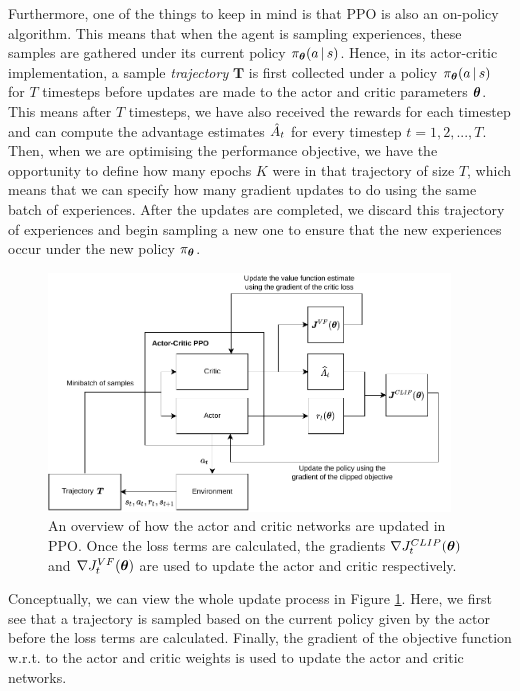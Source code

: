 Furthermore, one of the things to keep in mind is that PPO is also an on-policy algorithm. This means that when the agent is sampling experiences, these samples are gathered under its current policy $\pi_{\boldsymbol{\theta}} (a \, | \, s)$. Hence, in its actor-critic implementation, a sample \textit{trajectory} $\boldsymbol{T}$ is first collected under a policy $\pi_{\boldsymbol{\theta}} (a \, | \, s)$ for $T$ timesteps before updates are made to the actor and critic parameters $\boldsymbol{\theta}$. This means after $T$ timesteps, we have also received the rewards for each timestep and can compute the advantage estimates $\hat{A}_t$ for every timestep $t = 1, 2, ..., T$.
Then, when we are optimising the performance objective, we have the opportunity to define how many epochs $K$ were in that trajectory of size $T$, which means that we can specify how many gradient updates to do using the same batch of experiences. After the updates are completed, we discard this trajectory of experiences and begin sampling a new one to ensure that the new experiences occur under the new policy $\pi_{\boldsymbol{\theta}}$. 
\begin{figure}[ht]
    \centering
    \includegraphics[width=0.95\textwidth]{figures/2_RL/2_ppo_overview.pdf}
    \caption{An overview of how the actor and critic networks are updated in PPO. Once the loss terms are calculated, the gradients $\nabla J_t^{CLIP}(\boldsymbol{\theta})$ and  $\nabla J_t^{VF}(\boldsymbol{\theta})$ are used to update the actor and critic respectively.}
    \label{fig:2_ppo_overview}
\end{figure}
Conceptually, we can view the whole update process in Figure \ref{fig:2_ppo_overview}. Here, we first see that a trajectory is sampled based on the current policy given by the actor before the loss terms are calculated. Finally, the gradient of the objective function w.r.t. to the actor and critic weights is used to update the actor and critic networks.

